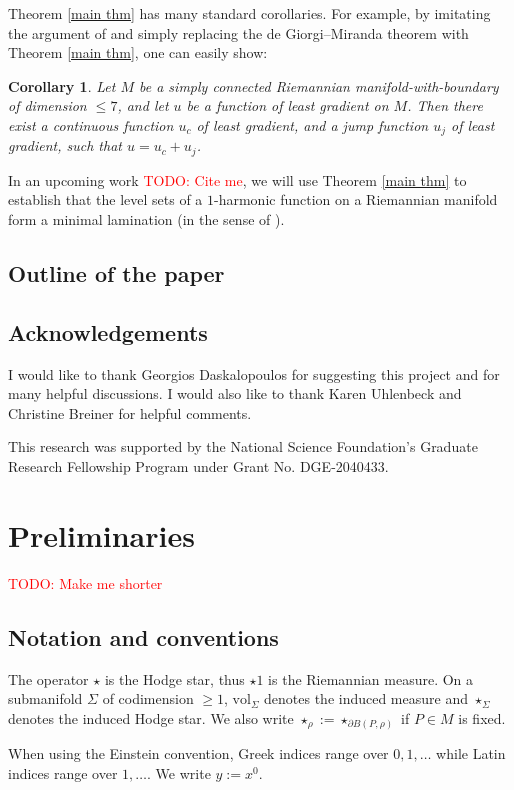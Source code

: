 \documentclass[reqno,11pt]{amsart}
\newcommand{\vol}{\mathrm{vol}}
\newtheorem{corollary}[theorem]{Corollary}
\theoremstyle{definition}
\numberwithin{equation}{section}
\newcommand\todo[1]{\textcolor{red}{TODO: #1}}
\begin{document}
Theorem \ref{main thm} has many standard corollaries.
For example, by imitating the argument of \cite{Loisel20} and simply replacing the de Giorgi--Miranda theorem with Theorem \ref{main thm}, one can easily show:

\begin{corollary}
Let $M$ be a simply connected Riemannian manifold-with-boundary of dimension $\leq 7$, and let $u$ be a function of least gradient on $M$.
Then there exist a continuous function $u_c$ of least gradient, and a jump function $u_j$ of least gradient, such that $u = u_c + u_j$.
\end{corollary}

In an upcoming work \todo{Cite me}, we will use Theorem \ref{main thm} to establish that the level sets of a $1$-harmonic function on a Riemannian manifold form a minimal lamination (in the sense of \cite{Morgan88}).

\subsection{Outline of the paper}


\subsection{Acknowledgements}
I would like to thank Georgios Daskalopoulos for suggesting this project and for many helpful discussions.
I would also like to thank Karen Uhlenbeck and Christine Breiner for helpful comments.

This research was supported by the National Science Foundation's Graduate Research Fellowship Program under Grant No. DGE-2040433.

\section{Preliminaries}
\label{Prelims}\todo{Make me shorter}
\subsection{Notation and conventions}
The operator $\star$ is the Hodge star, thus $\star 1$ is the Riemannian measure.
On a submanifold $\Sigma$ of codimension $\geq 1$, $\vol_\Sigma$ denotes the induced measure and $\star_\Sigma$ denotes the induced Hodge star. We also write $\star_\rho := \star_{\partial B(P, \rho)}$ if $P \in M$ is fixed.

When using the Einstein convention, Greek indices range over $0, 1, \dots$ while Latin indices range over $1, \dots$.
We write $y := x^0$.
\end{document}
